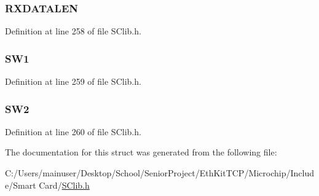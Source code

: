 \subsubsection[{R\+X\+D\+A\+T\+A\+L\+E\+N}]{ R\+X\+D\+A\+T\+A\+L\+E\+N}\label{struct_s_c___a_p_d_u___r_e_s_p_o_n_s_e_a7c4127a3f3a1615439989b13ede2154d}


Definition at line 258 of file S\+Clib.\+h.

\hypertarget{struct_s_c___a_p_d_u___r_e_s_p_o_n_s_e_a6b2c092c7ea52ca22026a017458cdbf8}{}
\subsubsection[{S\+W1}]{ S\+W1}\label{struct_s_c___a_p_d_u___r_e_s_p_o_n_s_e_a6b2c092c7ea52ca22026a017458cdbf8}


Definition at line 259 of file S\+Clib.\+h.

\hypertarget{struct_s_c___a_p_d_u___r_e_s_p_o_n_s_e_a49b232748a8c085d7940e953c32f4f8c}{}
\subsubsection[{S\+W2}]{ S\+W2}\label{struct_s_c___a_p_d_u___r_e_s_p_o_n_s_e_a49b232748a8c085d7940e953c32f4f8c}


Definition at line 260 of file S\+Clib.\+h.



The documentation for this struct was generated from the following file\+:\begin{DoxyCompactItemize}
\item 
C\+:/\+Users/mainuser/\+Desktop/\+School/\+Senior\+Project/\+Eth\+Kit\+T\+C\+P/\+Microchip/\+Include/\+Smart Card/\hyperlink{_s_clib_8h}{S\+Clib.\+h}\end{DoxyCompactItemize}
